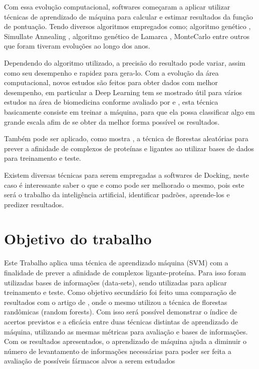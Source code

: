 \documentclass[tcc, capa]{texucpel}
\begin{document}
Com essa evolução computacional, softwares começaram a aplicar utilizar técnicas de aprendizado de máquina para calcular e estimar resultados da função de pontuação.
Tendo diversos algoritmos empregados como; algoritmo genético \cite{holland1975adaptation},  Simullate Annealing \cite{kirkpatrick1984optimization} ,  algoritmo genético de Lamarca \cite{morris1998automated},  MonteCarlo \cite{caflisch1992monte} entre outros que foram tiveram evoluções ao longo dos anos. 

Dependendo do algoritmo utilizado, a precisão do resultado pode variar, assim como seu desempenho e rapidez para gera-lo.
Com a evolução da área computacional, novos estudos são feitos para obter dados com melhor desempenho, em particular a Deep Learning tem se mostrado útil para vários estudos na área de biomedicina conforme avaliado por \cite{korotcov2017comparison} e \cite{mamoshina2016applications}, esta técnica basicamente consiste em treinar a máquina, para que ela possa classificar algo em grande escala afim de se obter da melhor forma possível  os resultados.

Também  pode ser aplicado, como mostra \cite{ballester2010machine}, a técnica de florestas aleatórias para prever a afinidade de complexos de proteínas e ligantes ao utilizar bases de dados para treinamento e teste.

Existem diversas técnicas para serem empregadas a softwares de Docking, neste caso é interessante saber o que e como pode ser melhorado o mesmo, pois este será o trabalho da inteligência artificial, identificar padrões, aprende-los e predizer resultados.

\section{Objetivo do trabalho}

Este Trabalho aplica uma técnica de aprendizado máquina (SVM) com a finalidade de prever a afinidade de complexos ligante-proteína. Para isso foram utilizadas bases de informações (data-sets), \cite{wang2004pdbbind} sendo utilizadas para aplicar treinamento e teste. 
Como objetivo secundário foi feito uma comparação de resultados com o artigo de \cite{ballester2010machine}, onde o mesmo utilizou a técnica de florestas randômicas (random forests).
Com isso será possível demonstrar o índice de acertos previstos e a eficácia entre duas técnicas distintas  de aprendizado de máquina, utilizando as mesmas métricas para avaliação e bases de informações.
Com os resultados apresentados, o aprendizado de máquina ajuda a diminuir o número de levantamento de informações necessárias para poder ser feita a  avaliação de possíveis fármacos alvos a serem estudados
\end{document}
